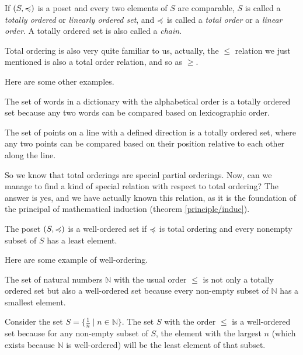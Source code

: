\begin{definition}
	If \( (S, \preccurlyeq) \) is a poset and every two elements of \( S \) are comparable, \( S \) is called a \emph{totally ordered} or \emph{linearly ordered set}, and \( \preccurlyeq \) is called a \emph{total order} or a \emph{linear order}. A totally ordered set is also called a \emph{chain}.
\end{definition}

Total ordering is also very quite familiar to us, actually, the $\leq$ relation we just mentioned is also a total order relation, and so as $\geq$. 

Here are some other examples.
\begin{example}
	The set of words in a dictionary with the alphabetical order is a totally ordered set because any two words can be compared based on lexicographic order.
\end{example}

\begin{example}
	The set of points on a line with a defined direction is a totally ordered set, where any two points can be compared based on their position relative to each other along the line.
\end{example}
So we know that total orderings are special partial orderings. Now, can we manage to find a kind of special relation with respect to total ordering? The answer is yes, and we have actually known this relation, as it is the foundation of the principal of mathematical induction (theorem \ref{principle/induc}).

\begin{definition}
	The poset $(S, \preccurlyeq)$ is a well-ordered set if $\preccurlyeq$ is total ordering and every nonempty subset of $S$ has a least element.
\end{definition}

Here are some example of well-ordering.

\begin{example}
	The set of natural numbers \( \mathbb{N} \) with the usual order \( \leq \) is not only a totally ordered set but also a well-ordered set because every non-empty subset of \( \mathbb{N} \) has a smallest element.
\end{example}


\begin{example}
	Consider the set \( S = \{\frac{1}{n} \mid n \in \mathbb{N}\} \). The set \( S \) with the order \( \leq \) is a well-ordered set because for any non-empty subset of \( S \), the element with the largest \( n \) (which exists because \( \mathbb{N} \) is well-ordered) will be the least element of that subset.
\end{example}

